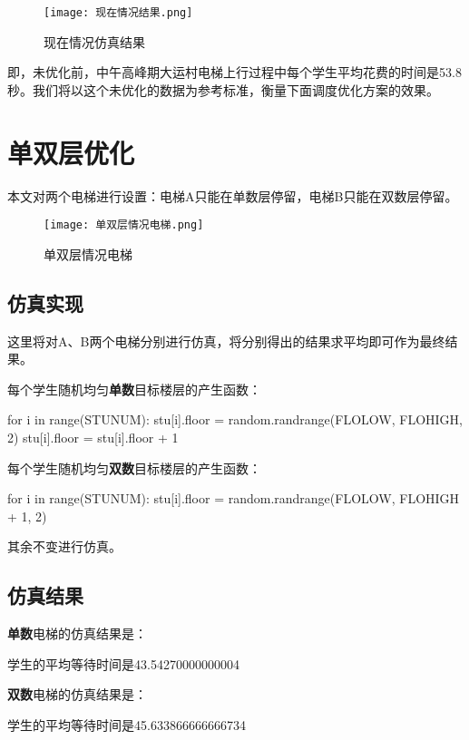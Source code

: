 \documentclass[letterpaper,12pt]{article}
\begin{document}
\begin{figure}[H]

\centering
\texttt{[image: 现在情况结果.png]}
\caption{现在情况仿真结果}
\label{fig:现在情况仿真结果}
 
\end{figure}



即，未优化前，中午高峰期大运村电梯上行过程中每个学生平均花费的时间是53.8秒。我们将以这个未优化的数据为参考标准，衡量下面调度优化方案的效果。
{}
\section{单双层优化}\label{单双层优化}
本文对两个电梯进行设置：电梯A只能在单数层停留，电梯B只能在双数层停留。

\begin{figure}[H]

\centering
\texttt{[image: 单双层情况电梯.png]}
\caption{单双层情况电梯}\label{fig:单双层情况电梯}
\end{figure}

\subsection{仿真实现}
这里将对A、B两个电梯分别进行仿真，将分别得出的结果求平均即可作为最终结果。

每个学生随机均匀\textbf{单数}目标楼层的产生函数：
\begin{python}
for i in range(STUNUM):
    stu[i].floor = random.randrange(FLOLOW, FLOHIGH, 2)
    stu[i].floor = stu[i].floor + 1
\end{python}

每个学生随机均匀\textbf{双数}目标楼层的产生函数：
\begin{python}
for i in range(STUNUM):
    stu[i].floor = random.randrange(FLOLOW, FLOHIGH + 1, 2)
\end{python}

其余不变进行仿真。

\subsection{仿真结果}
\textbf{单数}电梯的仿真结果是：
\begin{python}
学生的平均等待时间是43.54270000000004
\end{python}


\textbf{双数}电梯的仿真结果是：
\begin{python}
学生的平均等待时间是45.633866666666734
\end{python}
\end{document}
